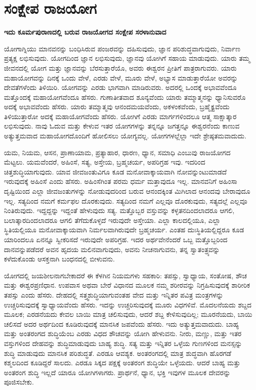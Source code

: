 \chapter{ಸಂಕ್ಷೇಪ ರಾಜಯೋಗ}%

\centerline{\textbf{ಇದು ಕೂರ್ಮಪುರಾಣದಲ್ಲಿ ಬರುವ ರಾಜಯೋಗದ ಸಂಕ್ಷೇಪ ಸರಳಾನುವಾದ}}

ಯೋಗಾಗ್ನಿಯು ಮಾನವನನ್ನು ಬಂಧಿಸಿರುವ ಪಂಜರವನ್ನು ದಹಿಸುವುದು, ಜ್ಞಾನ ಪರಿಶುದ್ಧವಾಗುವುದು, ನಿರ್ವಾಣ ಪ್ರತ್ಯಕ್ಷ ಲಭಿಸುವುದು. ಯೋಗದಿಂದ ಜ್ಞಾನ ಲಭಿಸುವುದು, ಜ್ಞಾನವು ಯೋಗಿಗೆ ಸಹಾಯ ಮಾಡುವುದು. ಯಾರು ತಮ್ಮ ಜೀವನದಲ್ಲಿ ಯೋಗ ಮತ್ತು ಜ್ಞಾನವನ್ನು ಬೆರಸುತ್ತಾರೆಯೊ, ಅವರು ಈಶ್ವರನ ಪ್ರೀತಿಗೆ ಪಾತ್ರರಾಗುವರು. ಯಾರು ಮಹಾಯೋಗವನ್ನು ದಿನಕ್ಕೆ ಒಂದು ವೇಳೆ, ಎರಡು ವೇಳೆ, ಮೂರು ವೇಳೆ, ಅಭ್ಯಾಸ ಮಾಡುತ್ತಾರೆಯೋ ಅವರನ್ನು ದೇವತೆಗಳೆಂದು ತಿಳಿಯಿರಿ. ಯೋಗವನ್ನು ಎರಡು ಭಾಗವಾಗಿ ಮಾಡಿರುವರು. ಅದರಲ್ಲಿ ಒಂದಕ್ಕೆ ಅಭಾವವೆಂದೂ ಮತ್ತೊಂದಕ್ಕೆ ಮಹಾಯೋಗವೆಂದೂ ಹೆಸರು. ಗುಣಾತೀತವಾದ ಶೂನ್ಯವೆಂದು ಯಾರು ತಮ್ಮಾತ್ಮನನ್ನು ಧ್ಯಾನಿಸುವರೊ ಅದಕ್ಕೆ ಅಭಾವವೆಂದು ಹೆಸರು. ಯಾರು ತಮ್ಮಾತ್ಮವು ಆನಂದಮಯವೆಂದು, ಅಕಳಂಕವೆಂದು, ಬ್ರಹ್ಮೈಕ್ಯವೆಂದು ತಿಳಿಯುತ್ತಾರೋ ಅದಕ್ಕೆ ಮಹಾಯೋಗವೆಂದು ಹೆಸರು. ಯೋಗಿಗೆ ಎರಡು ಮಾರ್ಗಗಳಿಂದಲೂ ಆತ್ಮ ಸಾಕ್ಷಾತ್ಕಾರ ಲಭಿಸುವುದು. ನಾವು ಓದುವ ಮತ್ತು ಕೇಳುವ ಇತರ ಯೋಗಗಳನ್ನು ತನ್ನನ್ನೂ ಜಗತ್ತನ್ನೂ ಈಶ್ವರನೆಂದು ಕಾಣುವ ಅತ್ಯುತ್ತಮವಾದ ಮಹಾಯೋಗದೊಂದಿಗೆ ಹೋಲಿಸಲು ಯೋಗ್ಯವಲ್ಲ. ಯೋಗಗಳಲ್ಲೆಲ್ಲಾ ಇದೇ ಶ್ರೇಷ್ಠತಮವಾದುದು. 

\vskip 5pt

ಯಮ, ನಿಯಮ, ಆಸನ, ಪ್ರಾಣಾಯಾಮ, ಪ್ರತ್ಯಾಹಾರ, ಧಾರಣ, ಧ್ಯಾನ, ಸಮಾಧಿ ಎಂಬುವು ರಾಜಯೋಗದ ಮೆಟ್ಟಲು. ಯಮವೆಂದರೆ, ಅಹಿಂಸೆ, ಸತ್ಯ, ಅಸ್ತೇಯ, ಬ್ರಹ್ಮಚರ್ಯ, ಅಪರಿಗ್ರಹ ಇವು. ಇದರಿಂದ ಚಿತ್ತಶುದ್ಧಿಯಾಗುವುದು. ಯಾವ ಜೀವಜಂತುವಿಗೂ ಕೂಡ ಮನೋವಾಕ್ಕಾಯವಾಗಿ ನೋವನ್ನುಂಟುಮಾಡದೆ ಇರುವುದಕ್ಕೆ ಅಹಿಂಸೆ ಎಂದು ಹೆಸರು. ಅಹಿಂಸೆಗಿಂತ ಪರಮ ಧರ್ಮ ಮತ್ತಾವುದೂ ಇಲ್ಲ. ಮಾನವನಿಗೆ ಅಹಿಂಸಾ ದೃಷ್ಟಿಯಿಂದ ಎಲ್ಲಾ ಜೀವಜಂತುಗಳನ್ನು ನೋಡುವುದರಿಂದ ಬರುವ ಆನಂದಕ್ಕಿಂತ ಮಿಗಿಲಾದ ಆನಂದವು ಬೇರಾವುದೂ ಇಲ್ಲ. ಸತ್ಯದಿಂದ ನಮಗೆ ಕರ್ಮಫಲ ದೊರಕುವುದು. ಸತ್ಯದಿಂದ ನಮಗೆ ಎಲ್ಲವೂ ದೊರಕುವುದು, ಸತ್ಯದಲ್ಲೆ ಎಲ್ಲವೂ ನಿಂತಿರುವುದು. ಇದ್ದದ್ದನ್ನು ಇದ್ದಂತೆ ಹೇಳುವುದು ಸತ್ಯ. ಮತ್ತೊಬ್ಬರ ವಸ್ತುವನ್ನು ಕಳ್ಳತನದಿಂದಲಾದರೂ ಆಗಲಿ, ಬಲಾತ್ಕಾರದಿಂದಲಾದರೂ ಆಗಲಿ ತೆಗೆದುಕೊಳ್ಳದೆ ಇರುವುದೇ ಅಸ್ತೇಯಾ. ಎಲ್ಲಾ ಕಾಲದಲ್ಲಿಯೂ, ಎಲ್ಲಾ ಸ್ಥಿತಿಯಲ್ಲಿಯೂ ಮನೋವಾಕ್ಕಾಯವಾಗಿ ನಿರ್ಮಲವಾಗಿರುವುದೇ ಬ್ರಹ್ಮಚರ್ಯ. ಎಂತಹ ದುಃಸ್ಥಿತಿಯಲ್ಲಿದ್ದರೂ ಕೂಡ ಯಾರಿಂದಲೂ ಏನನ್ನೂ ಸ್ವೀಕರಿಸದೆ ಇರುವುದೇ ಅಪರಿಗ್ರಹ. ಇದರ ಅರ್ಥವೇನೆಂದರೆ ಒಬ್ಬ ಮತ್ತೊಬ್ಬರಿಂದ ದಾನವನ್ನು\break ಪಡೆದರೆ ಅವನ ಹೃದಯ ಮಲಿನವಾಗುವುದು, ಅವನು ನೀಚನಾಗುವನು, ತನ್ನ ಸ್ವಾತಂತ್ರ್ಯವನ್ನು ಕಳೆದುಕೊಂಡು ಆಸಕ್ತನಾಗಿ ಬಂಧನದಲ್ಲಿ ಬೀಳುವನು. 


ಯೋಗದಲ್ಲಿ ಜಯಶೀಲನಾಗಬೇಕಾದರೆ ಈ ಕೆಳಗಿನ ನಿಯಮಗಳು ಸಹಕಾರಿ: ತಪಸ್ಸು, ಸ್ವಾಧ್ಯಾಯ, ಸಂತೋಷ, ಶೌಚ ಮತ್ತು ಈಶ್ವರಪ್ರಣಿಧಾನ. ಉಪವಾಸ ಅಥವಾ ಬೇರೆ ವಿಧಾನದ ಮೂಲಕ ನಮ್ಮ ಶರೀರವನ್ನು ನಿಗ್ರಹಿಸುವುದಕ್ಕೆ ಶಾರೀರಿಕ ತಪಸ್ಸು ಎಂದು ಹೆಸರು. ದೇಹದಲ್ಲಿ ಸತ್ತ್ವಶುದ್ಧಿಯಾಗುವಂತಹ ವೇದ ಮತ್ತು ಇನ್ನಿತರ ಪವಿತ್ರ ಮಂತ್ರಗಳನ್ನು ಉಚ್ಚರಿಸುವುದಕ್ಕೆ ಸ್ವಾಧ್ಯಾಯವೆಂದು ಹೆಸರು. ಇದನ್ನು ಉಚ್ಚರಿಸುವುದಕ್ಕೆ ಮೂರು ವಿಧಗಳಿವೆ. ಮೊದಲನೆಯದು ಶಬ್ದದ ಮೂಲಕ; ಎರಡನೆಯದು ಕೇವಲ ಬಾಯಿ ಮಾತ್ರ ಚಲಿಸುವುದು, ಆದರೆ ಶಬ್ದ ಕೇಳಿಸುವುದಿಲ್ಲ; ಮೂರನೆಯದು, ಬಾಯಿ ಚಲಿಸದೆ ಅದರ ಅರ್ಥದಿಂದ ಕೂಡಿರುವುದಕ್ಕೆ ಮಾನಸಿಕ ಜಪವೆಂದು ಹೆಸರು. ಇದು ಅತ್ಯುತ್ತಮವಾದುದು. ಬಾಹ್ಯ ಮತ್ತು ಅಂತರಂಗದ ಶುದ್ಧಿಯೆಂಬ ಎರಡು ವಿಧದ ಶೌಚವನ್ನು ಯೋಗಿ ಹೇಳುವನು. ನೀರು, ಮಣ್ಣು, ಮತ್ತು ಇತರ ವಸ್ತುಗಳಿಂದ ದೇಹವನ್ನು ಶುದ್ಧಿಮಾಡುವುದು ಬಾಹ್ಯ ಶುದ್ಧಿ. ಸತ್ಯ ಮತ್ತು ಇನ್ನಿತರ ಒಳ್ಳೆಯ ಗುಣಗಳಿಂದ ಮನಸ್ಸನ್ನು ಶುದ್ಧಿ ಮಾಡುವುದು ಮಾನಸಿಕ ಪರಿಶುದ್ಧತೆ. ಎರಡೂ ಆವಶ್ಯಕ. ಅಂತರಂಗದಲ್ಲಿ ಮಾತ್ರ ಶುದ್ಧವಾಗಿ ಹೊರಗಡೆ ಕಶ್ಮಲದಿಂದ ಕೂಡಿದ್ದರೆ ಸಾಲದು. ಎರಡೂ ಸಿಕ್ಕದ ಪಕ್ಷಕ್ಕೆ ಅಂತರಂಗ ಶುದ್ಧಿಯೇ ಒಳ್ಳೆಯದು. ಆದರೆ ಬಾಹ್ಯ ಮತ್ತು ಅಂತರಂಗ ಶುದ್ಧಿ ಇಲ್ಲದೆ ಯಾರೂ ಯೋಗಿಗಳಾಗರು. ಪ್ರಾರ್ಥನೆ, ಧ್ಯಾನ, ಭಕ್ತಿ ಇವುಗಳ ಮೂಲಕ ದೇವರನ್ನು ಪೂಜಿಸಬೇಕು. 

